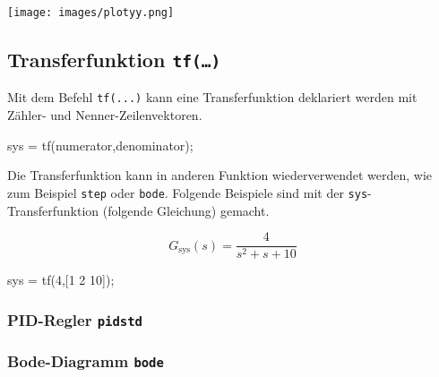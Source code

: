\documentclass[
  10pt,
  a4paper,
  twocolumn]{article}
\newenvironment{Shaded}{}{}
\newcommand{\FloatTok}[1]{\textcolor[rgb]{0.00,0.36,0.77}{#1}}
\newcommand{\NormalTok}[1]{\textcolor[rgb]{0.14,0.16,0.18}{#1}}
\newcommand{\OperatorTok}[1]{\textcolor[rgb]{0.14,0.16,0.18}{#1}}
\newcommand{\VariableTok}[1]{\textcolor[rgb]{0.89,0.38,0.04}{#1}}
\numberwithin{equation}{section}
\begin{document}
\texttt{[image: images/plotyy.png]}

\subsection{\texorpdfstring{Transferfunktion
\texttt{tf(…)}}{Transferfunktion tf(\ldots)}}\label{transferfunktion-tf}

Mit dem Befehl \texttt{tf(...)} kann eine Transferfunktion deklariert
werden mit Zähler- und Nenner-Zeilenvektoren.

\begin{Shaded}
\begin{Highlighting}[]
\VariableTok{sys} \OperatorTok{=} \VariableTok{tf}\NormalTok{(}\VariableTok{numerator}\OperatorTok{,}\VariableTok{denominator}\NormalTok{)}\OperatorTok{;}
\end{Highlighting}
\end{Shaded}

Die Transferfunktion kann in anderen Funktion wiederverwendet werden,
wie zum Beispiel \texttt{step} oder \texttt{bode}. Folgende Beispiele
sind mit der \texttt{sys}-Transferfunktion (folgende Gleichung) gemacht.

\[
G_{\text{sys}}(s) = \frac{4}{s^2+s+10}
\]

\begin{Shaded}
\begin{Highlighting}[]
\VariableTok{sys} \OperatorTok{=} \VariableTok{tf}\NormalTok{(}\FloatTok{4}\OperatorTok{,}\NormalTok{[}\FloatTok{1} \FloatTok{2} \FloatTok{10}\NormalTok{])}\OperatorTok{;}
\end{Highlighting}
\end{Shaded}

\subsubsection{\texorpdfstring{PID-Regler
\texttt{pidstd}}{PID-Regler pidstd}}\label{pid-regler-pidstd}

\begin{Shaded}
\begin{Highlighting}[]

\end{Highlighting}
\end{Shaded}

\subsubsection{\texorpdfstring{Bode-Diagramm
\texttt{bode}}{Bode-Diagramm bode}}\label{bode-diagramm-bode}
\end{document}
